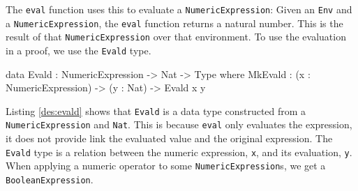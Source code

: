         The \texttt{eval} function uses this to evaluate a \texttt{NumericExpression}: Given an \texttt{Env} and a \texttt{NumericExpression}, the \texttt{eval} function returns a natural number. This is the result of that \texttt{NumericExpression} over that environment. To use the evaluation in a proof, we use the \texttt{Evald} type.
        \begin{code}[caption={\texttt{Evald} as defined in the \Idris model},label={des:evald}]
    data Evald : NumericExpression -> Nat -> Type where
        MkEvald : (x : NumericExpression) -> (y : Nat) -> Evald x y
        \end{code}
        Listing \ref{des:evald} shows that \texttt{Evald} is a data type constructed from a \texttt{NumericExpression} and \texttt{Nat}. This  is because \texttt{eval} only evaluates the expression, it does not provide link the evaluated value and the original expression. The \texttt{Evald} type is a relation between the numeric expression, \texttt{x}, and its evaluation, \texttt{y}.
        \\
        
        When applying a numeric operator to some \texttt{NumericExpression}s, we get a \texttt{BooleanExpression}.
    
    \newpage
    
